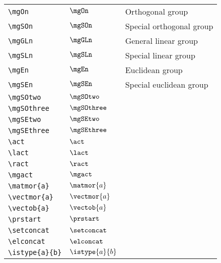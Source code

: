 \begin{longtable}{lll}
 \hline
\hline
{\color[rgb]{0.5,0.5,0.5}\texttt{\textbackslash mgOn}} & $\mgOn$ &  Orthogonal group\\ 
 {\color[rgb]{0.5,0.5,0.5}\texttt{\textbackslash mgSOn}} & $\mgSOn$ &  Special orthogonal group\\ 
 {\color[rgb]{0.5,0.5,0.5}\texttt{\textbackslash mgGLn}} & $\mgGLn$ &  General linear group\\ 
 {\color[rgb]{0.5,0.5,0.5}\texttt{\textbackslash mgSLn}} & $\mgSLn$ &  Special linear group\\ 
 {\color[rgb]{0.5,0.5,0.5}\texttt{\textbackslash mgEn}} & $\mgEn$ &  Euclidean group\\ 
 {\color[rgb]{0.5,0.5,0.5}\texttt{\textbackslash mgSEn}} & $\mgSEn$ &  Special euclidean group\\ 
 {\color[rgb]{0.5,0.5,0.5}\texttt{\textbackslash mgSOtwo}} & $\mgSOtwo$ & \\ 
 {\color[rgb]{0.5,0.5,0.5}\texttt{\textbackslash mgSOthree}} & $\mgSOthree$ & \\ 
 {\color[rgb]{0.5,0.5,0.5}\texttt{\textbackslash mgSEtwo}} & $\mgSEtwo$ & \\ 
 {\color[rgb]{0.5,0.5,0.5}\texttt{\textbackslash mgSEthree}} & $\mgSEthree$ & \\ 
 {\color[rgb]{0.5,0.5,0.5}\texttt{\textbackslash act}} & $\act$ & \\ 
 {\color[rgb]{0.5,0.5,0.5}\texttt{\textbackslash lact}} & $\lact$ & \\ 
 {\color[rgb]{0.5,0.5,0.5}\texttt{\textbackslash ract}} & $\ract$ & \\ 
 {\color[rgb]{0.5,0.5,0.5}\texttt{\textbackslash mgact}} & $\mgact$ & \\ 
 {\color[rgb]{0.5,0.5,0.5}\texttt{\textbackslash matmor\{a\}}} & $\matmor{a}$ & \\ 
 {\color[rgb]{0.5,0.5,0.5}\texttt{\textbackslash vectmor\{a\}}} & $\vectmor{a}$ & \\ 
 {\color[rgb]{0.5,0.5,0.5}\texttt{\textbackslash vectob\{a\}}} & $\vectob{a}$ & \\ 
 {\color[rgb]{0.5,0.5,0.5}\texttt{\textbackslash prstart}} & $\prstart$ & \\ 
 {\color[rgb]{0.5,0.5,0.5}\texttt{\textbackslash setconcat}} & $\setconcat$ & \\ 
 {\color[rgb]{0.5,0.5,0.5}\texttt{\textbackslash elconcat}} & $\elconcat$ & \\ 
 {\color[rgb]{0.5,0.5,0.5}\texttt{\textbackslash istype\{a\}\{b\}}} & $\istype{a}{b}$ & \\ 

\end{longtable}
